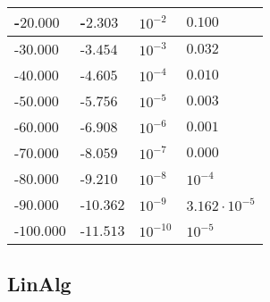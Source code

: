 \begin{center}
{\begin{tabular}{l|l|l|l}
		-$20.000$ & -$2.303$ & $10^{-2}$ & $0.100$ \\ \hline
		-$30.000$ & -$3.454$ & $10^{-3}$ & $0.032$ \\ \hline
		-$40.000$ & -$4.605$ & $10^{-4}$ & $0.010$ \\ \hline
		-$50.000$ & -$5.756$ & $10^{-5}$ & $0.003$ \\ \hline
		-$60.000$ & -$6.908$ & $10^{-6}$ & $0.001$ \\ \hline
		-$70.000$ & -$8.059$ & $10^{-7}$ & $0.000$ \\ \hline
		-$80.000$ & -$9.210$ & $10^{-8}$ & $10^{-4}$ \\ \hline
		-$90.000$ & -$10.362$ & $10^{-9}$ & $3.162 \cdot 10^{-5}$ \\ \hline
		-$100.000$ & -$11.513$ & $10^{-10}$ & $10^{-5}$ \\ \hline
	\end{tabular}
}
\end{center}
\clearpage
\subsection{LinAlg}
